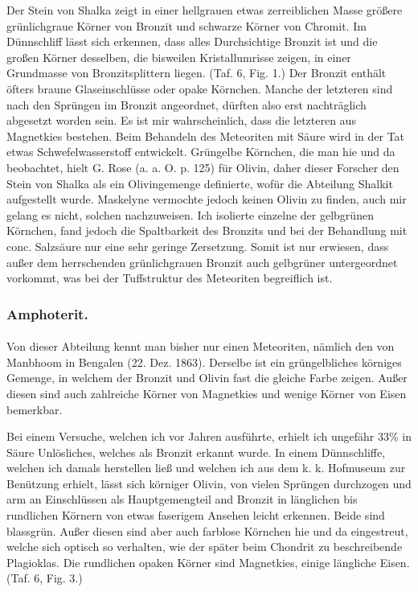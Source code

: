 \documentclass[a4paper, 12pt, oneside]{article}
\begin{document}
Der Stein von Shalka zeigt in einer hellgrauen etwas zerreiblichen Masse größere grünlichgraue Körner von Bronzit und schwarze Körner von Chromit. Im Dünnschliff lässt sich erkennen, dass alles Durchsichtige Bronzit ist und die großen Körner desselben, die bisweilen Kristallumrisse zeigen, in einer Grundmasse von Bronzitsplittern liegen. (Taf. 6, Fig. 1.) Der Bronzit enthält öfters braune Glaseinschlüsse oder opake Körnchen. Manche der letzteren sind nach den Sprüngen im Bronzit angeordnet, dürften also erst nachträglich abgesetzt worden sein. Es ist mir wahrscheinlich, dass die letzteren aus Magnetkies bestehen. Beim Behandeln des Meteoriten mit Säure wird in der Tat etwas Schwefelwasserstoff entwickelt. Grüngelbe Körnchen, die man hie und da beobachtet, hielt G. Rose (a. a. O. p. 125) für Olivin, daher dieser Forscher den Stein von Shalka als ein Olivingemenge definierte, wofür die Abteilung Shalkit aufgestellt wurde. Maskelyne vermochte jedoch keinen Olivin zu finden, auch mir gelang es nicht, solchen nachzuweisen. Ich isolierte einzelne der gelbgrünen Körnchen, fand jedoch die Spaltbarkeit des Bronzits und bei der Behandlung mit conc. Salzsäure nur eine sehr geringe Zersetzung. Somit ist nur erwiesen, dass außer dem herrschenden grünlichgrauen Bronzit auch gelbgrüner untergeordnet vorkommt, was bei der Tuffstruktur des Meteoriten begreiflich ist.

\subsubsection{Amphoterit.}
\paragraph{}
Von dieser Abteilung kennt man bisher nur einen Meteoriten, nämlich den von Manbhoom in Bengalen (22. Dez. 1863). Derselbe ist ein grüngelbliches körniges Gemenge, in welchem der Bronzit und Olivin fast die gleiche Farbe zeigen. Außer diesen sind auch zahlreiche Körner von Magnetkies und wenige Körner von Eisen bemerkbar.

Bei einem Versuche, welchen ich vor Jahren ausführte, erhielt ich ungefähr 33\% in Säure Unlösliches, welches als Bronzit erkannt wurde. In einem Dünnschliffe, welchen ich damals herstellen ließ und welchen ich aus dem k. k. Hofmuseum zur Benützung erhielt, lässt sich körniger Olivin, von vielen Sprüngen durchzogen und arm an Einschlüssen als Hauptgemengteil and Bronzit in länglichen bis rundlichen Körnern von etwas faserigem Ansehen leicht erkennen. Beide sind blassgrün. Außer diesen sind aber auch farblose Körnchen hie und da eingestreut, welche sich optisch so verhalten, wie der später beim Chondrit zu beschreibende Plagioklas. Die rundlichen opaken Körner sind Magnetkies, einige längliche Eisen. (Taf. 6, Fig. 3.)
\end{document}
